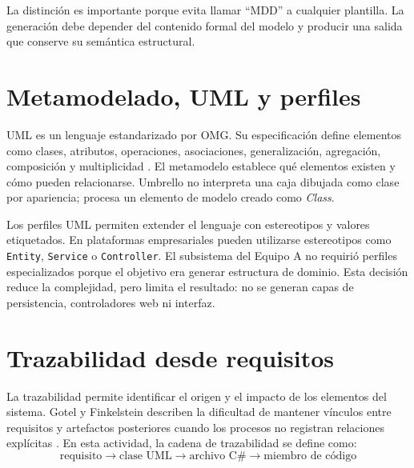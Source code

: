 La distinción es importante porque evita llamar ``MDD'' a cualquier plantilla. La generación debe depender del contenido formal del modelo y producir una salida que conserve su semántica estructural.

\section{Metamodelado, UML y perfiles}
UML es un lenguaje estandarizado por OMG. Su especificación define elementos como clases, atributos, operaciones, asociaciones, generalización, agregación, composición y multiplicidad \cite{OMG2017UML}. El metamodelo establece qué elementos existen y cómo pueden relacionarse. Umbrello no interpreta una caja dibujada como clase por apariencia; procesa un elemento de modelo creado como \textit{Class}.

Los perfiles UML permiten extender el lenguaje con estereotipos y valores etiquetados. En plataformas empresariales pueden utilizarse estereotipos como \texttt{Entity}, \texttt{Service} o \texttt{Controller}. El subsistema del Equipo A no requirió perfiles especializados porque el objetivo era generar estructura de dominio. Esta decisión reduce la complejidad, pero limita el resultado: no se generan capas de persistencia, controladores web ni interfaz.

\section{Trazabilidad desde requisitos}
La trazabilidad permite identificar el origen y el impacto de los elementos del sistema. Gotel y Finkelstein describen la dificultad de mantener vínculos entre requisitos y artefactos posteriores cuando los procesos no registran relaciones explícitas \cite{Gotel1994}. En esta actividad, la cadena de trazabilidad se define como:
\[
\text{requisito} \rightarrow \text{clase UML} \rightarrow \text{archivo C\#} \rightarrow \text{miembro de código}
\]


